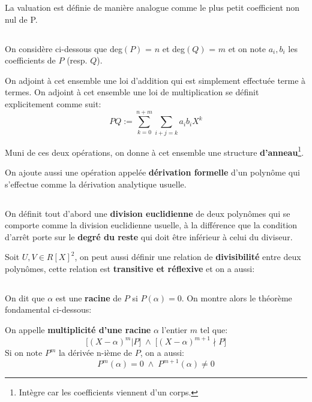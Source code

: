 La valuation est définie de manière analogue comme le plus petit coefficient non nul de P.
\subsection*{}
On considère ci-dessous que deg\((P)\) = \(n\) et deg\((Q)\) = \(m\) et on note \(a_i, b_i\) les coefficients de \(P\) (resp. \(Q\)).\<

On adjoint à cet ensemble une loi d'addition qui est simplement effectuée terme à termes.\+
On adjoint à cet ensemble une loi de multiplication se définit explicitement comme suit:
\[
   PQ := \sum_{k=0}^{n+m}\sum_{i+j = k} a_{i}b_{i}X^{k}
\]

Muni de ces deux opérations, on donne à cet ensemble une structure \textbf{d'anneau}\footnote[1]{Intègre car les coefficients viennent d'un corps.}.\<

On ajoute aussi une opération appelée \textbf{dérivation formelle} d'un polynôme qui s'effectue comme la dérivation analytique usuelle.
\subsection*{}
On définit tout d'abord une \textbf{division euclidienne} de deux polynômes qui se comporte comme la division euclidienne usuelle, à la différence que la condition d'arrêt porte sur le \textbf{degré du reste} qui doit être inférieur à celui du diviseur.\<

Soit \(U, V \in R[X]^2\), on peut aussi définir une relation de \textbf{divisibilité} entre deux polynômes, cette relation est \textbf{transitive et réflexive} et on a aussi:

\subsection*{}
On dit que \(\alpha\) est une \textbf{racine} de \(P\) si \(P(\alpha) = 0\).\+
On montre alors le théorème fondamental ci-dessous:
\pagebreak

On appelle \textbf{multiplicité d'une racine} \(\alpha\) l'entier \(m\) tel que:
\[
   \Bigr[ (X - \alpha)^m | P \Bigr] \; \land \; \Bigr[(X - \alpha)^{m+1} \nmid P\Bigr]
\]
Si on note \(P^{m}\) la dérivée n-ième de \(P\), on a aussi:
\[
   P^{m}(\alpha) = 0 \; \land \; P^{m + 1}(\alpha) \neq 0
\]

